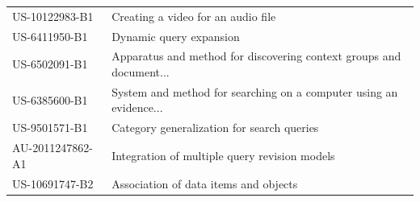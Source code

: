 \begin{table}[]
\begin{tabular}{ll}
US-10122983-B1   & Creating a video for an audio file                                                                              \\
US-6411950-B1    & Dynamic query expansion                                                                                         \\
US-6502091-B1    & Apparatus and method for discovering context groups and document...                \\
US-6385600-B1    & System and method for searching on a computer using an evidence...                                             \\
US-9501571-B1    & Category generalization for search queries                                                                      \\
AU-2011247862-A1 & Integration of multiple query revision models                                                                   \\
US-10691747-B2   & Association of data items and objects                                                                          
\end{tabular}
\end{table}




